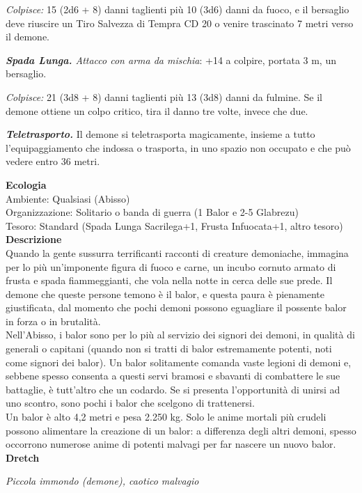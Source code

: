 \begin{multicols}{2}
\emph{Colpisce:} 15 (2d6 + 8) danni taglienti più 10 (3d6) danni da fuoco, e il bersaglio deve riuscire un Tiro Salvezza di Tempra CD 20 o venire trascinato 7 metri verso il demone.

\emph{\textbf{Spada Lunga.} Attacco con arma da mischia}: +14 a colpire, portata 3 m, un bersaglio.

\emph{Colpisce:} 21 (3d8 + 8) danni taglienti più 13 (3d8) danni da fulmine. Se il demone ottiene un colpo critico, tira il danno tre volte, invece che due.

\emph{\textbf{Teletrasporto.}} Il demone si teletrasporta magicamente, insieme a tutto l'equipaggiamento che indossa o trasporta, in uno spazio non occupato e che può vedere entro 36 metri.

\textbf{Ecologia}\\
Ambiente: Qualsiasi (Abisso)\\
Organizzazione: Solitario o banda di guerra (1 Balor e 2-5 Glabrezu)\\
Tesoro: Standard (Spada Lunga Sacrilega+1, Frusta Infuocata+1, altro tesoro)\\
\textbf{Descrizione}\\
Quando la gente sussurra terrificanti racconti di creature demoniache, immagina per lo più un'imponente figura di fuoco e carne, un incubo cornuto armato di frusta e spada fiammeggianti, che vola nella notte in cerca delle sue prede. Il demone che queste persone temono è il balor, e questa paura è pienamente giustificata, dal momento che pochi demoni possono eguagliare il possente balor in forza o in brutalità.\\
Nell'Abisso, i balor sono per lo più al servizio dei signori dei demoni, in qualità di generali o capitani (quando non si tratti di balor estremamente potenti, noti come signori dei balor). Un balor solitamente comanda vaste legioni di demoni e, sebbene spesso consenta a questi servi bramosi e sbavanti di combattere le sue battaglie, è tutt'altro che un codardo. Se si presenta l'opportunità di unirsi ad uno scontro, sono pochi i balor che scelgono di trattenersi.\\
Un balor è alto 4,2 metri e pesa 2.250 kg. Solo le anime mortali più crudeli possono alimentare la creazione di un balor: a differenza degli altri demoni, spesso occorrono numerose anime di potenti malvagi per far nascere un nuovo balor.\\


\medskip{}\textbf{Dretch}

\emph{Piccola immondo (demone), caotico malvagio}


\end{multicols}

